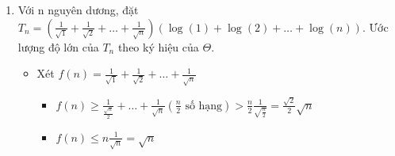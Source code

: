 \documentclass[12pt,a4paper]{article}
\begin{document}
\begin{enumerate}[label=\textbf{Câu 2.\arabic*} ]
\begin{itemize}[label=$\bullet$]
            Vậy $f_1(n)\in \theta(n^\frac{5}{6}).$ (1)
            \item Xét algorithm 2:
            \begin{center}
                Xét chi phí tính toán của thuật toán bằng số lần thực hiện phép gán $res+=j.$\\
                Vậy từ mã giả ta có được chi phí tính toán của thuật toán trên là :$\sum_{i = 1}^{\lfloor \sqrt[3]{n}\rfloor }\sum_{j = 1}^{\lfloor \sqrt{n-i^3}\rfloor }1.$
            \end{center}
            Vậy khi đó ta cần xem xét chi phí của $f_2(n)=\sqrt{n-1}+\sqrt{n-8}+\dots+0 \text{ với } \sqrt[3]{n} \text{ số hạng}.$
            Nhận xét:
            \begin{itemize}[label=$\bullet$]
                \item $f_2(n)\leq\sqrt{n-1}+\sqrt{n-1}+\dots+\sqrt{n-1} (\sqrt[3]{n}\text{ số hạng})=\sqrt[3]{n}\sqrt{n-1}\Rightarrow f_1(n)\in O(n^\frac{5}{6}).$
                \item $f_2(n)\geq \sqrt{n-1}+\sqrt{n-8}+\dots+\sqrt{n-\frac{n}{8}}\text{ }(\frac{\sqrt[3]{n}}{2}\text{ số hạng})\\ \\
                \hspace*{1cm}>\frac{\sqrt[3]{n}}{2}\sqrt{\frac{7n}{8}}=\frac{\sqrt{14}}{8}\sqrt{n}\sqrt[3]{n}\Rightarrow f_2(n)\in \Omega(n^\frac{5}{6}).$
            \end{itemize}
            Vậy $f_2(n)\in \theta(n^\frac{5}{6}).$ (2)
        \end{itemize}
        Từ (1),(2) ta suy ra độ phức tạp hai thuật toán là như nhau.
        \item Với n nguyên dương, đặt $T_{n}=(\frac{1}{\sqrt{1}}+\frac{1}{\sqrt{2}}+\dots+\frac{1}{\sqrt{n}})(\log(1)+\log(2)+\dots+\log(n)).$ Ước lượng độ lớn của $T_{n}$ theo ký hiệu của $\Theta.$
        \begin{itemize}[label=$\bullet$]
            \item Xét $f(n)=\frac{1}{\sqrt{1}}+\frac{1}{\sqrt{2}}+\dots+\frac{1}{\sqrt{n}}$
            \begin{itemize}[label=$\bullet$]
                \item $f(n) \geq \frac{1}{\frac{\sqrt{n}}{2}}+\dots+\frac{1}{\sqrt{n}}(\frac{n}{2}\text{ số hạng})>\frac{n}{2}\frac{1}{\sqrt{\frac{n}{2}}}=\frac{\sqrt{2}}{2}\sqrt{n}$
                \item $f(n)\leq n\frac{1}{\sqrt{n}}=\sqrt{n}$
            \end{itemize}

\end{itemize}
\end{enumerate}
\end{document}
